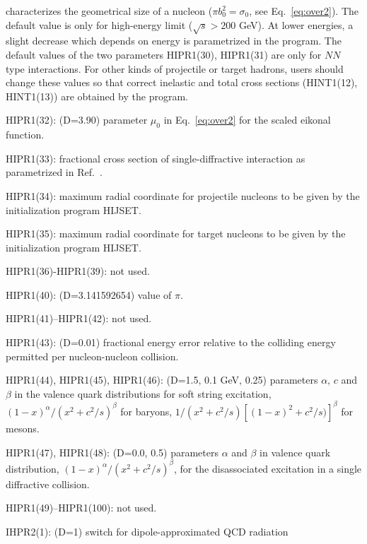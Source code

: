 \begin{description}
                characterizes the geometrical size of a nucleon
                ($\pi b_0^2=\sigma_0$, see Eq.~\ref{eq:over2}). 
                The default value is only for high-energy 
                limit ($\sqrt{s}>200$ GeV). At lower energies, a slight
                decrease which depends on energy is parametrized in the 
                program. The default values of the two parameters 
                HIPR1(30), HIPR1(31) are only for $NN$ type interactions. 
                For other kinds of projectile or target hadrons, users 
                should change these values so that correct inelastic 
                and total cross sections (HINT1(12), HINT1(13)) are
                obtained by the program. 
\item{}HIPR1(32): (D=3.90) parameter $\mu_0$ in Eq.~\ref{eq:over2} for
                the scaled eikonal function.
\item{}HIPR1(33): fractional cross section of single-diffractive
                interaction as parametrized in Ref.~\cite{goulianos}.
\item{}HIPR1(34): maximum radial coordinate for projectile nucleons 
                to be given by the initialization program HIJSET.
\item{}HIPR1(35): maximum radial coordinate for target nucleons 
                to be given by the initialization program HIJSET.
\item{}HIPR1(36)-HIPR1(39): not used.
\item{}HIPR1(40): (D=3.141592654) value of $\pi$.
\item{}HIPR1(41)--HIPR1(42): not used.
\item{}HIPR1(43): (D=0.01) fractional energy error relative to the 
                colliding energy permitted per nucleon-nucleon collision.
\item{}HIPR1(44), HIPR1(45), HIPR1(46): (D=1.5, 0.1 GeV, 0.25) parameters
                $\alpha$, $c$ and $\beta$ in the valence quark 
                distributions for soft string excitation, 
                $(1-x)^{\alpha}/(x^2+c^2/s)^{\beta}$ for baryons,
                $1/{(x^2+c^2/s)[(1-x)^2+c^2/s)]}^{\beta}$ for mesons.
\item{}HIPR1(47), HIPR1(48): (D=0.0, 0.5) parameters $\alpha$ and $\beta$
                in valence quark distribution, 
                $(1-x)^{\alpha}/(x^2+c^2/s)^{\beta}$, for the 
                disassociated excitation in a single diffractive collision.
\item{}HIPR1(49)--HIPR1(100): not used.
\item{}IHPR2(1): (D=1) switch for dipole-approximated QCD radiation 

\end{description}
